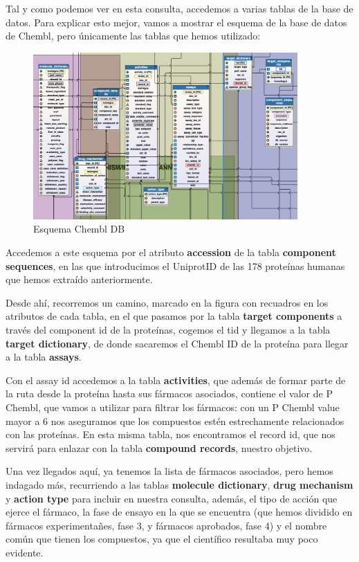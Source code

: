 	Tal y como podemos ver en esta consulta, accedemos a varias tablas de la base de datos. Para explicar esto mejor, vamos a mostrar el esquema de la base de datos de Chembl, pero únicamente las tablas que hemos utilizado:
    
    \begin{figure}[h!]
			\includegraphics[width=0.9\textwidth]{figures/esquema.png}
			\caption{Esquema Chembl DB}
			\label{fig:cost_megabase}
		\end{figure}
	
    Accedemos a este esquema por el atributo \textbf{accession} de la tabla \textbf{component sequences}, en las que introducimos el UniprotID de las 178 proteínas humanas que hemos extraído anteriormente.  
    
    Desde ahí, recorremos un camino, marcado en la figura con recuadros en los atributos de cada tabla, en el que pasamos por la tabla \textbf{target components} a través del component id de la proteínas, cogemos el tid y llegamos a la tabla \textbf{target dictionary}, de donde sacaremos el Chembl ID de la proteína para llegar a la tabla \textbf{assays}.  
    
    Con el assay id accedemos a la tabla \textbf{activities}, que además de formar parte de la ruta desde la proteína hasta sus fármacos asociados, contiene el valor de P Chembl, que vamos a utilizar para filtrar los fármacos: con un P Chembl value mayor a 6 nos aseguramos que los compuestos estén estrechamente relacionados con las proteínas. En esta misma tabla, nos encontramos el record id, que nos servirá para enlazar con la tabla \textbf{compound records}, nuestro objetivo. 
    
    Una vez llegados aquí, ya tenemos la lista de fármacos asociados, pero hemos indagado más, recurriendo a las tablas \textbf{molecule dictionary}, \textbf{drug mechanism} y \textbf{action type} para incluir en nuestra consulta, además, el tipo de acción que ejerce el fármaco, la fase de ensayo en la que se encuentra (que hemos dividido en fármacos experimentañes, fase 3, y fármacos aprobados, fase 4) y el nombre común que tienen los compuestos, ya que el científico resultaba muy poco evidente.
    
